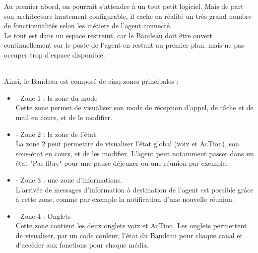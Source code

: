 \documentclass{rapport}
\begin{document}
\begin{minipage}{0.65\textwidth}
Au premier abord, on pourrait s'attendre à un tout petit logiciel. Mais de part son architecture hautement configurable, il cache en réalité un très grand nombre de fonctionnalités selon les métiers de l'agent connecté.\\

Le tout est dans un espace restreint, car le Bandeau doit être ouvert continuellement sur le poste de l'agent en restant au premier plan, mais ne pas occuper trop d'espace disponible.  
\end{minipage}
\begin{minipage}{0.25\textwidth}
\raggedright
\end{minipage}
\vspace{10mm} %
\noindent
\\

Ainsi, le Bandeau est composé de cinq zones principales :

\vspace{5mm} %
\begin{minipage}{0.25\textwidth}
\end{minipage}
\begin{minipage}{0.65\textwidth}

\begin{itemize}
\item -	Zone 1 : la zone du mode \\
Cette zone permet de visualiser son mode de réception d’appel, de tâche et de mail en cours, et de le modifier.\\

\item -	Zone 2 : la zone de l’état\\
La zone 2 peut permettre de visualiser l’état global (voix et AcTion), son sous-état en cours, et de les modifier. L'agent peut notamment passer dans un état "Pas libre" pour une pause déjeuner ou une réunion par exemple.\\

\item -	Zone 3 : une zone d’informations.\\
L'arrivée de messages d'information à destination de l'agent est possible grâce à cette zone, comme par exemple la notification d'une nouvelle réunion. \\

\item -	Zone 4 : Onglets\\
Cette zone contient les deux onglets voix et AcTion. 
Les onglets permettent de visualiser, par un code couleur, l’état du Bandeau pour chaque canal et d’accéder aux fonctions pour chaque média.
\end{itemize}

\end{minipage}
\vspace{10mm} %
\noindent
\\
\end{document}
